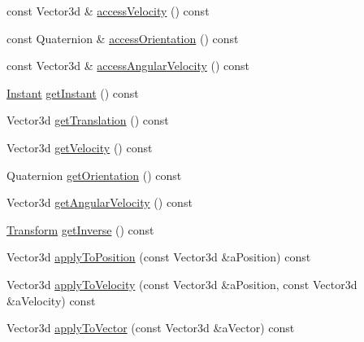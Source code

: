 \begin{DoxyCompactItemize}
\item 
const Vector3d \& \hyperlink{classostk_1_1physics_1_1coord_1_1_transform_a662ec4284f667bd704e9e003ea9924fd}{access\+Velocity} () const
\item 
const Quaternion \& \hyperlink{classostk_1_1physics_1_1coord_1_1_transform_aa246be611bf1928c9f67ffd6d2fe6e10}{access\+Orientation} () const
\item 
const Vector3d \& \hyperlink{classostk_1_1physics_1_1coord_1_1_transform_ae344e90f3419630a16d413224675a003}{access\+Angular\+Velocity} () const
\item 
\hyperlink{classostk_1_1physics_1_1time_1_1_instant}{Instant} \hyperlink{classostk_1_1physics_1_1coord_1_1_transform_a65a2cf0c24e5e2320b828d9bfb461d17}{get\+Instant} () const
\item 
Vector3d \hyperlink{classostk_1_1physics_1_1coord_1_1_transform_a1f54141f1d9c292e1767094e466320d0}{get\+Translation} () const
\item 
Vector3d \hyperlink{classostk_1_1physics_1_1coord_1_1_transform_a4a0a98719b6cc22ebb4dcb31cea7f0c9}{get\+Velocity} () const
\item 
Quaternion \hyperlink{classostk_1_1physics_1_1coord_1_1_transform_a21304f024b42a3d566166201df3ee5f9}{get\+Orientation} () const
\item 
Vector3d \hyperlink{classostk_1_1physics_1_1coord_1_1_transform_a54809903e2bd21032c461326427d56cc}{get\+Angular\+Velocity} () const
\item 
\hyperlink{classostk_1_1physics_1_1coord_1_1_transform}{Transform} \hyperlink{classostk_1_1physics_1_1coord_1_1_transform_a5ef781c60716faaf49befca0380285fe}{get\+Inverse} () const
\item 
Vector3d \hyperlink{classostk_1_1physics_1_1coord_1_1_transform_a1cdeac1d1e35d966c6c309d3507a6ccb}{apply\+To\+Position} (const Vector3d \&a\+Position) const
\item 
Vector3d \hyperlink{classostk_1_1physics_1_1coord_1_1_transform_a7d57f9e66f59711534ed8ba3e0719995}{apply\+To\+Velocity} (const Vector3d \&a\+Position, const Vector3d \&a\+Velocity) const
\item 
Vector3d \hyperlink{classostk_1_1physics_1_1coord_1_1_transform_a13f0ac6674ecb6748219f4ffc6a23e6e}{apply\+To\+Vector} (const Vector3d \&a\+Vector) const
\end{DoxyCompactItemize}
